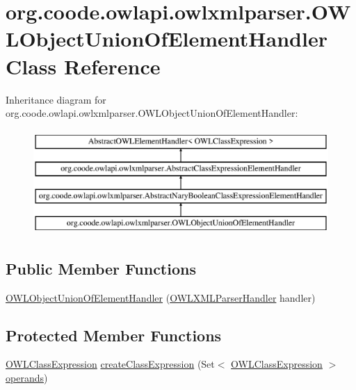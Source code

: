 \hypertarget{classorg_1_1coode_1_1owlapi_1_1owlxmlparser_1_1_o_w_l_object_union_of_element_handler}{\section{org.\-coode.\-owlapi.\-owlxmlparser.\-O\-W\-L\-Object\-Union\-Of\-Element\-Handler Class Reference}
\label{classorg_1_1coode_1_1owlapi_1_1owlxmlparser_1_1_o_w_l_object_union_of_element_handler}
}
Inheritance diagram for org.\-coode.\-owlapi.\-owlxmlparser.\-O\-W\-L\-Object\-Union\-Of\-Element\-Handler\-:\begin{figure}[H]
\begin{center}
\leavevmode
\includegraphics[height=4.000000cm]{classorg_1_1coode_1_1owlapi_1_1owlxmlparser_1_1_o_w_l_object_union_of_element_handler}
\end{center}
\end{figure}
\subsection*{Public Member Functions}
\begin{DoxyCompactItemize}
\item 
\hyperlink{classorg_1_1coode_1_1owlapi_1_1owlxmlparser_1_1_o_w_l_object_union_of_element_handler_a6325f55a03942eed2b0f99d48473e561}{O\-W\-L\-Object\-Union\-Of\-Element\-Handler} (\hyperlink{classorg_1_1coode_1_1owlapi_1_1owlxmlparser_1_1_o_w_l_x_m_l_parser_handler}{O\-W\-L\-X\-M\-L\-Parser\-Handler} handler)
\end{DoxyCompactItemize}
\subsection*{Protected Member Functions}
\begin{DoxyCompactItemize}
\item 
\hyperlink{interfaceorg_1_1semanticweb_1_1owlapi_1_1model_1_1_o_w_l_class_expression}{O\-W\-L\-Class\-Expression} \hyperlink{classorg_1_1coode_1_1owlapi_1_1owlxmlparser_1_1_o_w_l_object_union_of_element_handler_ae6ee1c04446d2c15ad3cc308049a49a3}{create\-Class\-Expression} (Set$<$ \hyperlink{interfaceorg_1_1semanticweb_1_1owlapi_1_1model_1_1_o_w_l_class_expression}{O\-W\-L\-Class\-Expression} $>$ \hyperlink{classorg_1_1coode_1_1owlapi_1_1owlxmlparser_1_1_abstract_nary_boolean_class_expression_element_handler_a9d005ffcc6e7dac31391c38dd5e0e750}{operands})
\end{DoxyCompactItemize}


